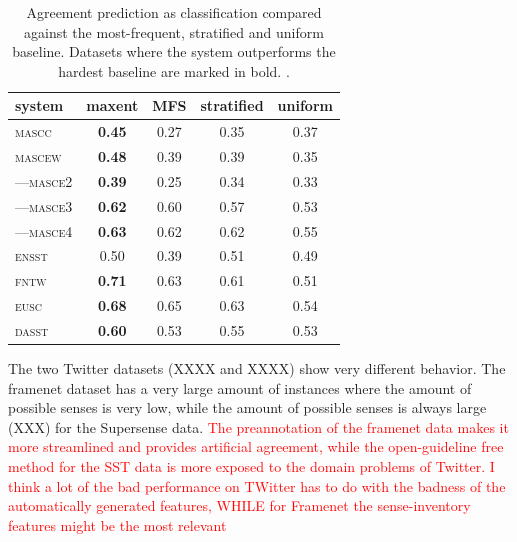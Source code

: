 \documentclass[11pt,a4paper]{article}
\begin{document}
\begin{table}[Ht!]

\begin{center}
  \begin{tabular}{lc|ccc}
 \toprule
system & maxent & MFS & stratified & uniform\\ 
 \midrule
 \textsc{mascc} & \textbf{0.45} & 0.27 & 0.35 & 0.37\\ 

 \textsc{mascew} & \textbf{0.48} & 0.39 & 0.39 & 0.35\\ 
---\textsc{masce2} & \textbf{0.39} & 0.25 & 0.34 & 0.33\\ 
---\textsc{masce3} & \textbf{0.62} & 0.60 & 0.57 & 0.53\\ 
---\textsc{masce4} & \textbf{0.63} & 0.62 & 0.62 & 0.55\\ 
\textsc{ensst} & 0.50 & 0.39 & 0.51 & 0.49\\ 
\textsc{fntw} & \textbf{0.71} & 0.63 & 0.61 & 0.51\\ 

\textsc{eusc}  & \textbf{0.68} & 0.65 & 0.63 & 0.54 \\
\textsc{dasst} & \textbf{0.60} & 0.53 & 0.55 & 0.53\\ 

\bottomrule

  \end{tabular}  
\end{center}
\caption{Agreement prediction as classification compared against the most-frequent, stratified and uniform baseline. Datasets where the system outperforms the hardest baseline are marked in bold. \label{tab:classresults}.}
\end{table} 

The two Twitter datasets (XXXX and XXXX) show very different behavior. The framenet dataset has a very large  amount of instances where the amount of possible senses is very low, while the amount of possible senses is always large (XXX) for the Supersense data. \textcolor{red}{The preannotation of the framenet data makes it more streamlined and provides artificial agreement, while the open-guideline free method for the SST data is more exposed to the domain problems of Twitter. I think a lot of the bad performance on TWitter has to do with the badness of the automatically generated features, WHILE for Framenet the sense-inventory features might be the most relevant}


%
\end{document}
